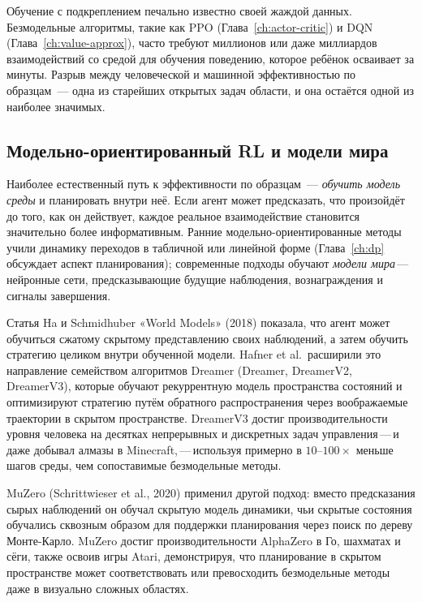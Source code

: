 Обучение с подкреплением печально известно своей жаждой данных. Безмодельные
алгоритмы, такие как PPO (Глава~\ref{ch:actor-critic})
и DQN (Глава~\ref{ch:value-approx}), часто требуют миллионов или
даже миллиардов взаимодействий со средой для обучения поведению, которое
ребёнок осваивает за минуты. Разрыв между человеческой и машинной
эффективностью по образцам~--- одна из старейших открытых задач области, и
она остаётся одной из наиболее значимых.

\subsection{Модельно-ориентированный RL и модели мира}

Наиболее естественный путь к эффективности по образцам~--- \emph{обучить модель
среды} и планировать внутри неё. Если агент может предсказать, что
произойдёт до того, как он действует, каждое реальное взаимодействие становится значительно более
информативным. Ранние модельно-ориентированные методы учили динамику переходов в
табличной или линейной форме (Глава~\ref{ch:dp} обсуждает
аспект планирования); современные подходы обучают \emph{модели мира}\,---\,нейронные
сети, предсказывающие будущие наблюдения, вознаграждения и сигналы завершения.

Статья Ha и Schmidhuber «World Models» (2018) показала, что агент
может обучиться сжатому скрытому представлению своих
наблюдений, а затем обучить стратегию целиком внутри обученной
модели. Hafner et al.\ расширили это направление семейством алгоритмов Dreamer
(Dreamer, DreamerV2, DreamerV3), которые обучают
рекуррентную модель пространства состояний и оптимизируют стратегию путём
обратного распространения через воображаемые траектории в скрытом пространстве.
DreamerV3 достиг производительности уровня человека на десятках непрерывных и
дискретных задач управления\,---\,и даже добывал алмазы в Minecraft,\,---\,используя
примерно в $10$--$100\times$ меньше шагов среды, чем сопоставимые
безмодельные методы.

MuZero (Schrittwieser et al., 2020) применил другой подход:
вместо предсказания сырых наблюдений он обучал скрытую модель динамики,
чьи скрытые состояния обучались сквозным образом для поддержки планирования
через поиск по дереву Монте-Карло. MuZero достиг производительности
AlphaZero в Го, шахматах и сёги, также освоив игры Atari,
демонстрируя, что планирование в скрытом пространстве может соответствовать или превосходить
безмодельные методы даже в визуально сложных областях.

